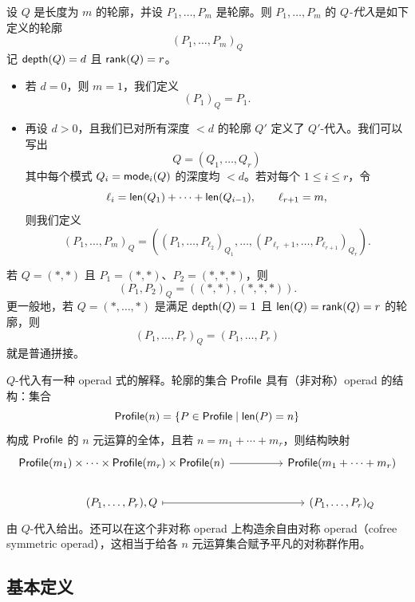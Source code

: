 \begin{definition}\label{definitionofPconcatenation}
    设 $Q$ 是长度为 $m$ 的轮廓，并设 $P_1,\dots,P_m$ 是轮廓。则 $P_1,\dots,P_m$ 的 $Q${\it -代入}是如下定义的轮廓
    \[
    (P_1,\dots,P_m)_Q
    \]
    记 $\mathsf{depth}(Q) = d$ 且 $\mathsf{rank}(Q) = r$。
    \begin{itemize}[left = 0pt]
        \item 若 $d = 0$，则 $m = 1$，我们定义
        \[
        (P_1)_Q = P_1.
        \]
        \item 再设 $d > 0$，且我们已对所有深度 $<d$ 的轮廓 $Q'$ 定义了 $Q'$-代入。我们可以写出
    \[
    Q = (Q_1,\dots, Q_r)
    \]
    其中每个模式 $Q_i = \mathsf{mode}_i(Q)$ 的深度均 $< d$。若对每个 $1 \leq i \leq r$，令
    \[\ell_i = \mathsf{len}(Q_1) + \cdots + \mathsf{len}(Q_{i-1}),\qquad \ell_{r+1}=m,\]
    则我们定义
    \[
    (P_1,\dots,P_m)_Q = ((P_{1},\dots,P_{\ell_2})_{Q_1},\dots,(P_{\ell_r +1},\dots,P_{\ell_{r+1}})_{Q_r}).
    \]
    \end{itemize}
\end{definition}

\begin{example}
    若 $Q = (*,*)$ 且 $P_1 = (*,*)$、$P_2 = (*,*,*)$，则
    \[
    (P_1,P_2)_Q = ( (*,*), (*,*,*)).
    \]
    更一般地，若 $Q = (*,\dots,*)$ 是满足 $\mathsf{depth}(Q) = 1$ 且 $\mathsf{len}(Q) = \mathsf{rank}(Q) = r$ 的轮廓，则
    \[
    (P_1,\dots,P_r)_Q = (P_1,\dots,P_r)
    \]
    就是普通拼接。
\end{example}


\begin{aside}
    $Q$-代入有一种 operad 式的解释。轮廓的集合 $\mathsf{Profile}$ 具有（非对称）operad 的结构：集合
    \[
    \mathsf{Profile}(n) = \{P \in \mathsf{Profile} \mid \mathsf{len}(P) = n\}
    \]
    构成 $\mathsf{Profile}$ 的 $n$ 元运算的全体，且若 $n = m_1 + \cdots + m_r$，则结构映射
    \[ \begin{tikzcd}
     \mathterm{Profile}(m_1)\times \dots \times \mathterm{Profile}(m_r) \times \mathterm{Profile}(n) \ar[rr] & &  \mathterm{Profile}(m_1 + \cdots + m_r)\\
    (P_1,\dots,P_r),Q \ar[rr,mapsto] & & (P_1,\dots,P_r)_Q
    \end{tikzcd}\]
    由 $Q$-代入给出。还可以在这个非对称 operad 上构造余自由对称 operad（cofree symmetric operad），这相当于给各 $n$ 元运算集合赋予平凡的对称群作用。
\end{aside}




\subsection{基本定义}


